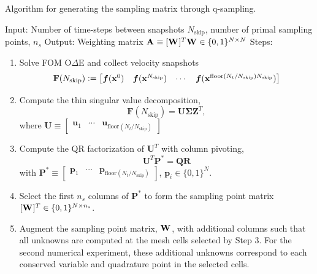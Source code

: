 \documentclass[3p,computermodern,10pt]{elsarticle}
\begin{document}
\begin{appendices}
\begin{algorithm}
\caption{Algorithm for generating the sampling matrix through q-sampling.}
\label{alg:qdeim}
Input: Number of time-steps between snapshots $N_{\text{skip}}$, number of primal sampling points, $n_s$ \; 
Output: Weighting matrix $\mathbf{A}^{} \equiv [\mathbf{W}^{}]^T \mathbf{W}^{} \in \{0,1\}^{N \times N}$ \;
Steps:
\begin{enumerate}
    \item Solve FOM O$\Delta$E and collect velocity snapshots 
$$\mathbf{F}(N_{\text{skip}}) \vcentcolon= \begin{bmatrix} \boldsymbol f ({\mathbf{x}}^{0})  & \boldsymbol f( {\mathbf{x}}^{N_{\text{skip}}}) & \cdots & \boldsymbol f( {\mathbf{x}}^{\text{floor}(N_t/N_{\text{skip}})N_{\text{skip}}} ) \end{bmatrix}$$
    \item Compute the thin singular value decomposition, $$\mathbf{F} (N_{\text{skip}}) = \mathbf{U \Sigma Z}^T,$$
    where $\mathbf{U} \equiv \begin{bmatrix} \mathbf{u}_1 & \cdots & \mathbf{u}_{\text{floor}(N_t/N_{\text{skip}})}\end{bmatrix}$
    \item Compute the QR factorization of  $\mathbf{U}^T$ with column pivoting,
    \begin{equation*}
        \mathbf{U}^T \mathbf{P}^* = \mathbf{QR}
    \end{equation*}
    with $\mathbf{P}^* \equiv \begin{bmatrix} \mathbf{p}_1 & \cdots & \mathbf{p}_{\text{floor}(N_t/N_{\text{skip}})} \end{bmatrix}$, $\mathbf{p}_i \in \{0,1\}^N$. 
    \item Select the first $n_s$ columns of $\mathbf{P}^*$ to form the sampling point matrix $[\mathbf{W}^{}]^T \in \{0,1\}^{N \times n_s}$. 
    \item Augment the sampling point matrix, $\mathbf{W}^{}$, with additional columns such that all unknowns are computed at the mesh cells selected by Step 3. For the second numerical experiment, these additional unknowns correspond to each conserved variable and quadrature point in the selected cells. 
\end{enumerate}


\end{algorithm}




\end{appendices}
\end{document}
